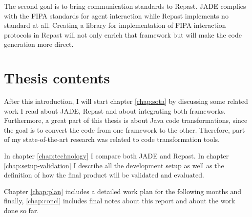 The second goal is to bring communication standards to Repast. JADE complies
with the FIPA standards for agent interaction while Repast implements no
standard at all. Creating a library for implementation of FIPA interaction
protocols in Repast will not only enrich that framework but will make the code
generation more direct.
 

\section{Thesis contents} \label{sec:struct}

After this introduction, I will start chapter \ref{chap:sota} by discussing some related work I read
about JADE, Repast and about integrating both frameworks. Furthermore, a great part of this thesis is about Java code transformations, since the goal is to convert the code from one framework to the other.
Therefore, part of my state-of-the-art research was related to code
transformation tools.

In chapter \ref{chap:technology} I compare both JADE and Repast. In chapter \ref{chap:setup-validation} I describe all the development setup
as well as the definition of how the final product will be validated and evaluated.

Chapter \ref{chap:plan} includes a detailed work plan for the following months
and finally, \ref{chap:concl} includes final notes about this report and about
the work done so far.